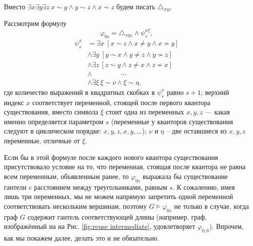 


Вместо 
$\exists x \exists y \exists z ~ x \sim y \wedge y \sim z \wedge x \sim z$
будем писать 
$\triangle_{xyz}$

Рассмотрим формулу
\[ \varphi_{0s} = \triangle_{xyz} \wedge \psi_s^{x \xi},\]
\begin{equation}
\label{f:gantel}
\begin{split}
\psi_s^x &= \exists x ~ 
    \left[ x \sim z \wedge x \neq y \wedge x \nsim y  \right] \\
&\wedge \exists y ~
    \left[ y \sim x \wedge y \neq z \wedge y \nsim z \right] \\
&\wedge \exists z ~
    \left[ z \sim y \wedge z \neq x \wedge z \nsim x  \right] \\
&\wedge ~ \qquad \qquad \cdots \\
&\wedge \exists \xi ~ 
    \xi \sim \nu \wedge \xi \sim \eta,
\end{split}
\end{equation}
где количество выражений в квадратных скобках в $\psi_{s}^{x}$ равно $s+1$; верхний индекс $x$ соответствует переменной, стоящей после первого квантора существования, вместо символа $\xi$ стоит одна из переменных $x,y,z$ --- какая именно определяется параметром $s$ (переменные у кванторов существования следуют в циклическом порядке: $x,y,z,x,y, \ldots$); $\nu$ и $\eta$ -- две оставшиеся из $x,y,z$ переменные, отличные от $\xi$. 

Если бы в этой формуле после каждого нового квантора существования присутствовало условие на то, что переменная, стоящая после квантора не равна всем переменным, объявленным ранее, то $\varphi_{0s}$ выражала бы существование гантели c расстоянием между треугольниками, равным $s$.
К сожалению, имея лишь три переменных, мы не можем напрямую запретить одной переменной соответствовать нескольким вершинам, поэтому $G \vDash \varphi_{0s}$ не только в случае, когда граф $G$ содержит гантель соответствующей длины (например, граф, изображённый на на Рис. \ref{fig:reuse intermediate}, удовлетворяет $\varphi_{0,6}$).
Впрочем, как мы покажем далее, делать это и не обязательно.


